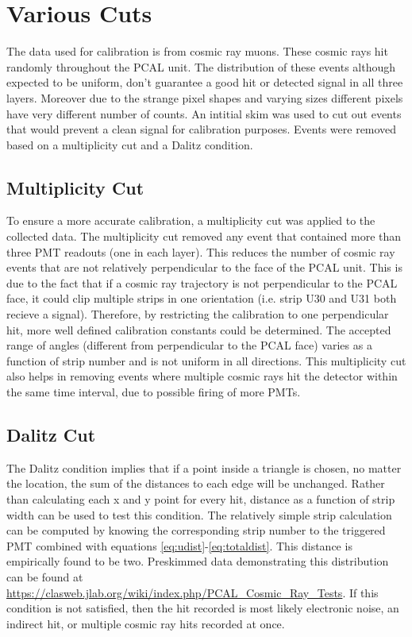 \section{Various Cuts}
The data used for calibration is from cosmic ray muons. These cosmic rays hit randomly throughout the PCAL unit. 
The distribution of these events although expected to be uniform, don't guarantee a good hit or detected signal in all three layers.
Moreover due to the strange pixel shapes and varying sizes different pixels have very different number of counts. 
An intitial skim was used to cut out events that would prevent a clean signal for calibration purposes.
Events were removed based on a multiplicity cut and a Dalitz condition.



\FloatBarrier
\subsection{Multiplicity Cut}
To ensure a more accurate calibration, a multiplicity cut was applied to the collected data. 
The multiplicity cut removed any event that contained more than three PMT readouts (one in each layer). 
This reduces the number of cosmic ray events that are not relatively perpendicular to the face of the PCAL unit.
This is due to the fact that if a cosmic ray trajectory is not perpendicular to the PCAL face, it could clip multiple strips 
in one orientation (i.e. strip U30 and U31 both recieve a signal). Therefore, by restricting the calibration to one perpendicular
hit, more well defined calibration constants could be determined. The accepted range of angles (different from perpendicular
to the PCAL face) varies as a function of strip number and is not uniform in all directions. This multiplicity cut also 
helps in removing events where multiple cosmic rays hit the detector within the same time interval, due to possible firing of more PMTs. 



 \FloatBarrier
\subsection{Dalitz Cut} 
The Dalitz condition implies that if a point inside a triangle is chosen, no matter the location, the sum of the distances to each edge will be unchanged.
Rather than calculating each x and y point for every hit, distance as a function of strip width can be used to test this condition.
The relatively simple strip calculation can be computed by knowing the corresponding strip number to the triggered PMT combined with equations \ref{eq:udist}-\ref{eq:totaldist}.
This distance is empirically found to be two.
Preskimmed data demonstrating this distribution can be found at \url{https://clasweb.jlab.org/wiki/index.php/PCAL_Cosmic_Ray_Tests}. 
If this condition is not satisfied, then the hit recorded is most likely electronic noise, an indirect hit, or multiple cosmic ray hits recorded at once.

